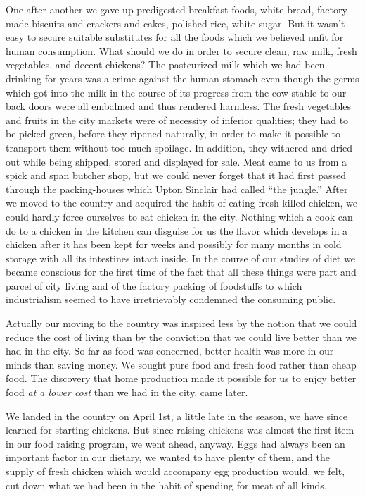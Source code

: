 \documentclass{book}
\begin{document}
One after another we gave up predigested breakfast foods, white bread, factory-made biscuits and crackers and cakes, polished rice, white sugar. But it wasn’t easy to secure suitable substitutes for all the foods which we believed unfit for human consumption. What should we do in order to secure clean, raw milk, fresh vegetables, and decent chickens? The pasteurized milk which we had been drinking for years was a crime against the human stomach even though the germs which got into the milk in the course of its progress from the cow-stable to our back doors were all embalmed and thus rendered harmless. The fresh vegetables and fruits in the city markets were of necessity of inferior qualities; they had to be picked green, before they ripened naturally, in order to make it possible to transport them without too much spoilage. In addition, they withered and dried out while being shipped, stored and displayed for sale. Meat came to us from a spick and span butcher shop, but we could never forget that it had first passed through the packing-houses which Upton Sinclair had called “the jungle.” After we moved to the country and acquired the habit of eating fresh-killed chicken, we could hardly force ourselves to eat chicken in the city. Nothing which a cook can do to a chicken in the kitchen can disguise for us the flavor which develops in a chicken after it has been kept for weeks and possibly for many months in cold storage with all its intestines intact inside. In the course of our studies of diet we became conscious for the first time of the fact that all these things were part and parcel of city living and of the factory packing of foodstuffs to which industrialism seemed to have irretrievably condemned the consuming public.

Actually our moving to the country was inspired less by the notion that we could reduce the cost of living than by the conviction that we could live better than we had in the city. So far as food was concerned, better health was more in our minds than saving money. We sought pure food and fresh food rather than cheap food. The discovery that home production made it possible for us to enjoy better food \emph{at a lower cost} than we had in the city, came later.

We landed in the country on April 1st, a little late in the season, we have since learned for starting chickens. But since raising chickens was almost the first item in our food raising program, we went ahead, anyway. Eggs had always been an important factor in our dietary, we wanted to have plenty of them, and the supply of fresh chicken which would accompany egg production would, we felt, cut down what we had been in the habit of spending for meat of all kinds.
\end{document}
